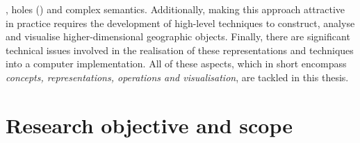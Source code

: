 , holes ()
and complex semantics.
Additionally, making this approach attractive in practice requires the development of high-level techniques to construct, analyse and visualise higher-dimensional geographic objects.
Finally, there are significant technical issues involved in the realisation of these representations and techniques into a computer implementation.
All of these aspects, which in short encompass \emph{concepts, representations, operations and visualisation}, are tackled in this thesis.

\section{Research objective and scope}
\label{se:objective}

